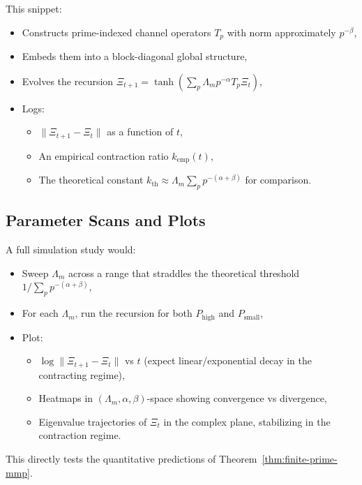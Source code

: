 \documentclass[12pt]{article}
\begin{document}
This snippet:

\begin{itemize}
  \item Constructs prime-indexed channel operators \(T_p\) with norm approximately \(p^{-\beta}\),
  \item Embeds them into a block-diagonal global structure,
  \item Evolves the recursion \(\Xi_{t+1} = \tanh(\sum_p \Lambda_m p^{-\alpha} T_p \Xi_t)\),
  \item Logs:
        \begin{itemize}
          \item \(\|\Xi_{t+1}-\Xi_t\|\) as a function of \(t\),
          \item An empirical contraction ratio \(k_{\mathrm{emp}}(t)\),
          \item The theoretical constant \(k_{\mathrm{th}}\approx \Lambda_m\sum_p p^{-(\alpha+\beta)}\) for comparison.
        \end{itemize}
\end{itemize}

\subsection{Parameter Scans and Plots}

A full simulation study would:

\begin{itemize}
  \item Sweep \(\Lambda_m\) across a range that straddles the theoretical threshold \(1/\sum_p p^{-(\alpha+\beta)}\),
  \item For each \(\Lambda_m\), run the recursion for both \(P_{\mathrm{high}}\) and \(P_{\mathrm{small}}\),
  \item Plot:
        \begin{itemize}
          \item \(\log \|\Xi_{t+1}-\Xi_t\|\) vs \(t\) (expect linear/exponential decay in the contracting regime),
          \item Heatmaps in \((\Lambda_m,\alpha,\beta)\)-space showing convergence vs divergence,
          \item Eigenvalue trajectories of \(\Xi_t\) in the complex plane, stabilizing in the contraction regime.
        \end{itemize}
\end{itemize}

This directly tests the quantitative predictions of Theorem~\ref{thm:finite-prime-mmp}.
\end{document}
